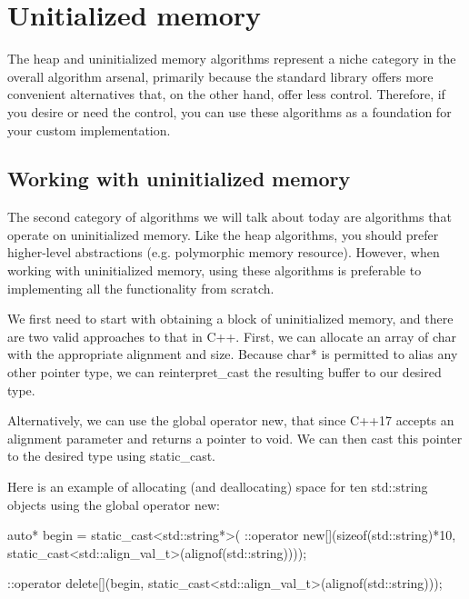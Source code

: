 \section{Unitialized memory}

The heap and uninitialized memory algorithms represent a niche category in the overall algorithm arsenal, primarily because the standard library offers more convenient alternatives that, on the other hand, offer less control. Therefore, if you desire or need the control, you can use these algorithms as a foundation for your custom implementation.



\subsection{Working with uninitialized memory}

The second category of algorithms we will talk about today are algorithms that operate on uninitialized memory. Like the heap algorithms, you should prefer higher-level abstractions (e.g. polymorphic memory resource). However, when working with uninitialized memory, using these algorithms is preferable to implementing all the functionality from scratch.

We first need to start with obtaining a block of uninitialized memory, and there are two valid approaches to that in C++. First, we can allocate an array of char with the appropriate alignment and size. Because char* is permitted to alias any other pointer type, we can reinterpret\_cast the resulting buffer to our desired type.

Alternatively, we can use the global operator new, that since C++17 accepts an alignment parameter and returns a pointer to void. We can then cast this pointer to the desired type using static\_cast.

Here is an example of allocating (and deallocating) space for ten std::string objects using the global operator new:

\begin{box-note}
\begin{cppcode}
auto* begin = static_cast<std::string*>(
                  ::operator new[](sizeof(std::string)*10, 
                                   static_cast<std::align_val_t>(alignof(std::string))));

::operator delete[](begin, static_cast<std::align_val_t>(alignof(std::string)));
\end{cppcode}
\end{box-note}


